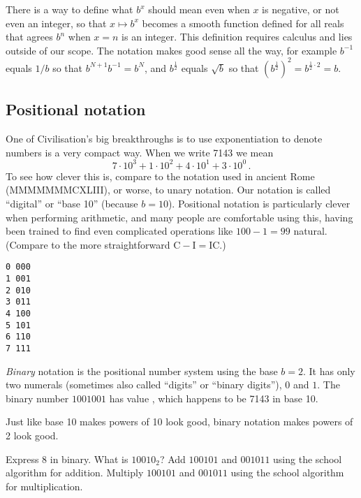 \documentclass{tufte-handout}
\begin{document}
There is a way to define what $b^x$ should mean even when $x$ is
negative, or not even an integer, so that $x\mapsto b^x$ becomes a
smooth function defined for all reals that agrees $b^n$ when $x=n$ is
an integer.  This definition requires calculus and lies outside of our
scope.  The notation makes good sense all the way, for example
$b^{-1}$ equals $1/b$ so that $b^{N+1}b^{-1}= b^N$, and 
$b^{\frac{1}{2}}$ equals  $\sqrt b$ so that
$(b^{\frac{1}{2}})^2 = b^{\frac{1}{2}\cdot 2} = b$.

\subsection{Positional notation}

One of Civilisation's big breakthroughs is to use exponentiation to
denote numbers is a very compact way. When we write 7143 we mean \[
7\cdot 10^3 + 1\cdot 10^2 + 4\cdot 10^1 + 3\cdot 10^0 \,.\]
To see how clever this is, compare to the notation used in ancient Rome
(MMMMMMMCXLIII), or worse, to unary notation. 
Our notation is called ``digital'' or ``base 10'' (because
$b=10$). 
Positional notation is particularly clever when performing
arithmetic, 
and many people are comfortable using this, having been trained to find
even complicated operations like $100-1=99$ natural. (Compare to the
more straightforward $\mathrm{C}-\mathrm{I} = \mathrm{IC}$.)

\begin{marginfigure}
\begin{verbatim}
0 000
1 001
2 010
3 011
4 100
5 101
6 110
7 111
\end{verbatim}
\end{marginfigure}

\emph{Binary} notation is the positional number system using the base
$b=2$.
It has only two numerals (sometimes also called ``digits'' or ``binary
digits''), $0$ and $1$.
The binary number $1001001$ has value ,
which happens to be 7143 in base 10. 

Just like base 10 makes powers of 10 look good, binary notation makes
powers of 2 look good. 

\begin{ExerciseList}
\Exercise
Express 8 in binary. What is $10010_2$?
\Exercise Add $100101$ and $001011$ using the school algorithm for
addition.
\Exercise Multiply $100101$ and $001011$ using the school algorithm for multiplication.
\end{ExerciseList}
\end{document}
